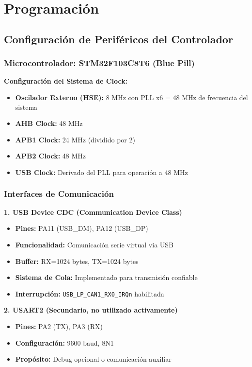 \documentclass[12pt]{article}
\begin{document}

\section{Programación}
\subsection{Configuración de Periféricos del Controlador}

\subsubsection{Microcontrolador: STM32F103C8T6 (Blue Pill)}

\textbf{Configuración del Sistema de Clock:}
\begin{itemize}
    \item \textbf{Oscilador Externo (HSE):} 8 MHz con PLL x6 = 48 MHz de frecuencia del sistema
    \item \textbf{AHB Clock:} 48 MHz
    \item \textbf{APB1 Clock:} 24 MHz (dividido por 2)
    \item \textbf{APB2 Clock:} 48 MHz
    \item \textbf{USB Clock:} Derivado del PLL para operación a 48 MHz
\end{itemize}

\subsubsection{Interfaces de Comunicación}

\textbf{1. USB Device CDC (Communication Device Class)}
\begin{itemize}
    \item \textbf{Pines:} PA11 (USB\_DM), PA12 (USB\_DP)
    \item \textbf{Funcionalidad:} Comunicación serie virtual via USB
    \item \textbf{Buffer:} RX=1024 bytes, TX=1024 bytes
    \item \textbf{Sistema de Cola:} Implementado para transmisión confiable
    \item \textbf{Interrupción:} \texttt{USB\_LP\_CAN1\_RX0\_IRQn} habilitada
\end{itemize}

\textbf{2. USART2 (Secundario, no utilizado activamente)}
\begin{itemize}
    \item \textbf{Pines:} PA2 (TX), PA3 (RX)
    \item \textbf{Configuración:} 9600 baud, 8N1
    \item \textbf{Propósito:} Debug opcional o comunicación auxiliar
\end{itemize}
\end{document}
